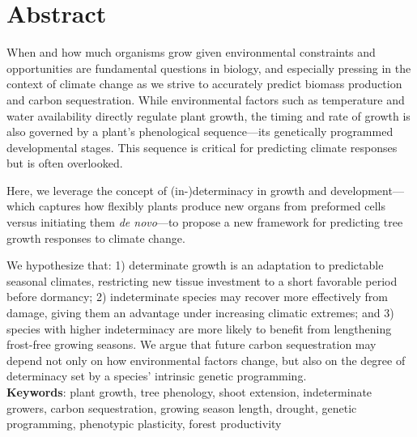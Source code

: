 \documentclass{article}
\begin{document}
	
	
\section*{Abstract} %
	When and how much organisms grow given environmental constraints and opportunities are fundamental questions in biology, and especially pressing in the context of climate change as we strive to accurately predict biomass production and carbon sequestration. While environmental factors such as temperature and water availability directly regulate plant growth, the timing and rate of growth is also governed by a plant’s phenological sequence—its genetically programmed developmental stages. This sequence is critical for predicting climate responses but is often overlooked.
	
	Here, we leverage the concept of (in-)determinacy in growth and development—which captures how flexibly plants produce new organs from preformed cells versus initiating them \textit{de novo}—to propose a new framework for predicting tree growth responses to climate change.
	
	We hypothesize that: 1) determinate growth is an adaptation to predictable seasonal climates, restricting new tissue investment to a short favorable period before dormancy; 2) indeterminate species may recover more effectively from damage, giving them an advantage under increasing climatic extremes; and 3) species with higher indeterminacy are more likely to benefit from lengthening frost-free growing seasons. 
	We argue that future carbon sequestration may depend not only on how environmental factors change, but also on the degree of determinacy set by a species’ intrinsic genetic programming.\\
		
			\textbf{Keywords}: plant growth, tree phenology, shoot extension, indeterminate growers, carbon sequestration, growing season length, drought, genetic programming, phenotypic plasticity, forest productivity
			\newpage
			
\end{document}
